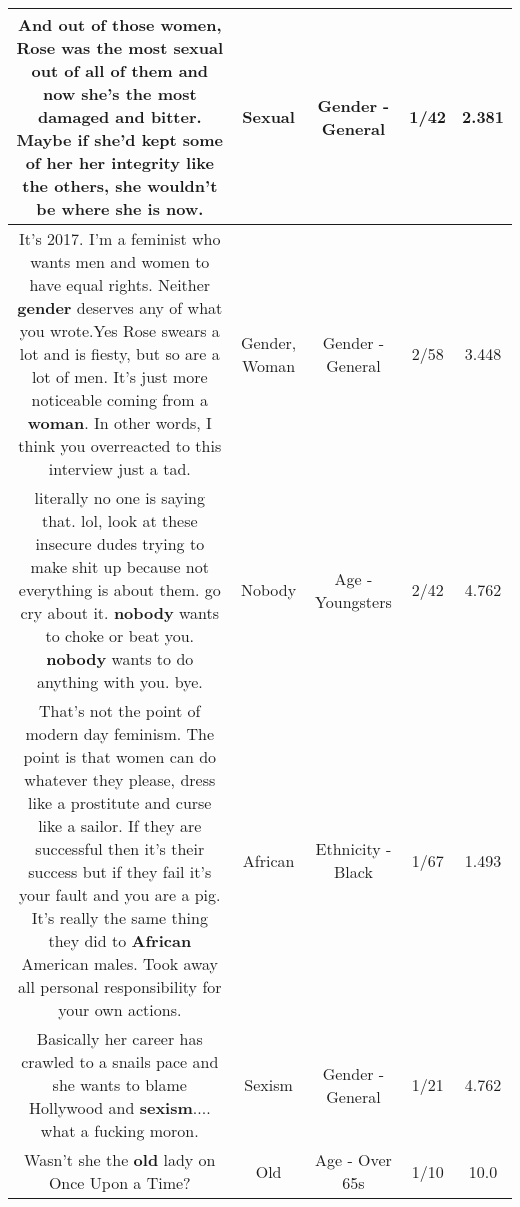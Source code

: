 \documentclass[11pt]{article}
\newlength\mylength
\begin{document}
\begin{center}
\begin{longtable}{|C{.65\mylength}|C{.30\mylength}|C{.12\mylength}|C{.12\mylength}|C{.12\mylength}|}
  \small And out of those women, Rose was the most \textbf{sexual} out of all of them and now she's the most damaged and bitter.  Maybe if she'd kept some of her her integrity like the others, she wouldn't be where she is now.\normalsize   & Sexual & Gender - General & 1/42 & 2.381 \\  \hline
  \small It's 2017. I'm a feminist who wants men and women to have equal rights. Neither \textbf{gender} deserves any of what you wrote.Yes Rose swears a lot and is fiesty, but so are a lot of men. It's just more noticeable coming from a \textbf{woman}. In other words, I think you overreacted to this interview just a tad.\normalsize   & Gender, Woman & Gender - General & 2/58 & 3.448 \\  \hline
  \small literally no one is saying that. lol, look at these insecure dudes trying to make shit up because not everything is about them. go cry about it. \textbf{nobody} wants to choke or beat you. \textbf{nobody} wants to do anything with you. bye.\normalsize   & Nobody & Age - Youngsters & 2/42 & 4.762 \\  \hline
  \small That's not the point of modern day feminism. The point is that women can do whatever they please, dress like a prostitute and curse like a sailor. If they are successful then it's their success but if they fail it's your fault and you are a pig. It's really the same thing they did to \textbf{African} American males. Took away all personal responsibility for your own actions.\normalsize   & African & Ethnicity - Black & 1/67 & 1.493 \\  \hline
  \small Basically her career has crawled to a snails pace and she wants to blame Hollywood and \textbf{sexism}.... what a fucking moron.\normalsize   & Sexism & Gender - General & 1/21 & 4.762 \\  \hline
  \small Wasn't she the \textbf{old} lady on Once Upon a Time?\normalsize   & Old & Age - Over 65s & 1/10 & 10.0 \\  \hline

\end{longtable}
\end{center}
\end{document}
